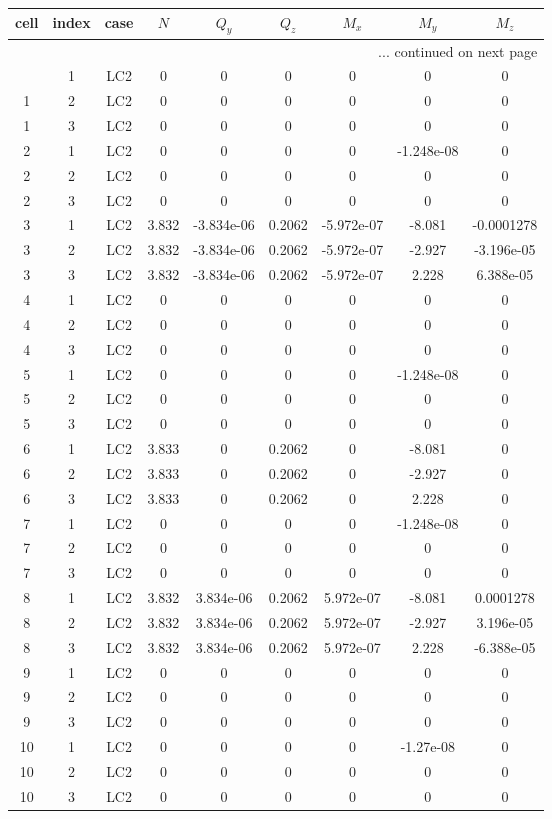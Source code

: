 \documentclass{article}%
\begin{document}
\begin{longtable}{| c c c | c c c c c c |}%
\hline%
cell&index&case&$N$&$Q_y$&$Q_z$&$M_x$&$M_y$&$M_z$\\%
\hline%
\endhead%
\hline%
\multicolumn{9}{r}{... continued on next page}\\%
\endfoot%
\hline%
\endlastfoot%
1&1&LC2&0&0&0&0&0&0\\%
1&2&LC2&0&0&0&0&0&0\\%
1&3&LC2&0&0&0&0&0&0\\%
2&1&LC2&0&0&0&0&{-}1.248e{-}08&0\\%
2&2&LC2&0&0&0&0&0&0\\%
2&3&LC2&0&0&0&0&0&0\\%
3&1&LC2&3.832&{-}3.834e{-}06&0.2062&{-}5.972e{-}07&{-}8.081&{-}0.0001278\\%
3&2&LC2&3.832&{-}3.834e{-}06&0.2062&{-}5.972e{-}07&{-}2.927&{-}3.196e{-}05\\%
3&3&LC2&3.832&{-}3.834e{-}06&0.2062&{-}5.972e{-}07&2.228&6.388e{-}05\\%
4&1&LC2&0&0&0&0&0&0\\%
4&2&LC2&0&0&0&0&0&0\\%
4&3&LC2&0&0&0&0&0&0\\%
5&1&LC2&0&0&0&0&{-}1.248e{-}08&0\\%
5&2&LC2&0&0&0&0&0&0\\%
5&3&LC2&0&0&0&0&0&0\\%
6&1&LC2&3.833&0&0.2062&0&{-}8.081&0\\%
6&2&LC2&3.833&0&0.2062&0&{-}2.927&0\\%
6&3&LC2&3.833&0&0.2062&0&2.228&0\\%
7&1&LC2&0&0&0&0&{-}1.248e{-}08&0\\%
7&2&LC2&0&0&0&0&0&0\\%
7&3&LC2&0&0&0&0&0&0\\%
8&1&LC2&3.832&3.834e{-}06&0.2062&5.972e{-}07&{-}8.081&0.0001278\\%
8&2&LC2&3.832&3.834e{-}06&0.2062&5.972e{-}07&{-}2.927&3.196e{-}05\\%
8&3&LC2&3.832&3.834e{-}06&0.2062&5.972e{-}07&2.228&{-}6.388e{-}05\\%
9&1&LC2&0&0&0&0&0&0\\%
9&2&LC2&0&0&0&0&0&0\\%
9&3&LC2&0&0&0&0&0&0\\%
10&1&LC2&0&0&0&0&{-}1.27e{-}08&0\\%
10&2&LC2&0&0&0&0&0&0\\%
10&3&LC2&0&0&0&0&0&0\\%

\end{longtable}
\end{document}

